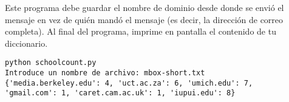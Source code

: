\begin{ex}
Este programa debe guardar el nombre de dominio
desde donde se envió el mensaje en vez de quién mandó el mensaje
(es decir, la dirección de correo completa). Al final
del programa, imprime en pantalla el contenido de tu diccionario.

\beforeverb
\begin{verbatim}
python schoolcount.py
Introduce un nombre de archivo: mbox-short.txt
{'media.berkeley.edu': 4, 'uct.ac.za': 6, 'umich.edu': 7, 
'gmail.com': 1, 'caret.cam.ac.uk': 1, 'iupui.edu': 8}
\end{verbatim}
\afterverb
\end{ex}